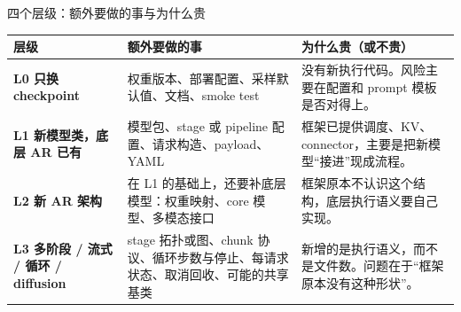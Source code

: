 \begin{frame}[t]{四个层级：额外要做的事与为什么贵}
\scriptsize\def\codesize{\relax}
\renewcommand{\arraystretch}{1.16}
\setlength{\tabcolsep}{3pt}
\begin{tabularx}{\textwidth}{>{\bfseries}p{1.6cm} Y Y}
\toprule
{}
层级 & 额外要做的事 & 为什么贵（或不贵） \\
\midrule
L0 \newline 只换 checkpoint & 权重版本、部署配置、采样默认值、文档、smoke test & 没有新执行代码。风险主要在配置和 prompt 模板是否对得上。 \\
L1 \newline 新模型类，底层 AR 已有 & 模型包、stage 或 pipeline 配置、请求构造、payload、YAML & 框架已提供调度、KV、connector，主要是把新模型“接进”现成流程。 \\
L2 \newline 新 AR 架构 & 在 L1 的基础上，还要补底层模型：权重映射、core 模型、多模态接口 & 框架原本不认识这个结构，底层执行语义要自己实现。 \\
L3 \newline 多阶段 / 流式 / 循环 / diffusion & stage 拓扑或图、chunk 协议、循环步数与停止、每请求状态、取消回收、可能的共享基类 & 新增的是执行语义，而不是文件数。问题在于“框架原本没有这种形状”。 \\
\bottomrule
\end{tabularx}
\vspace{2pt}
\end{frame}

